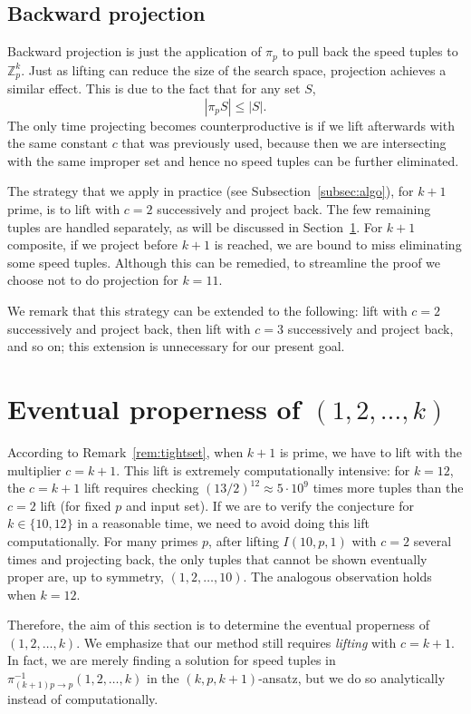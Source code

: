 \documentclass[11pt]{amsart}
\newcommand{\Z}{\mathbb{Z}}
\newcommand{\onetok}{(1, 2, \dots, k)}
\theoremstyle{definition}
\theoremstyle{remark}
\begin{document}
\subsection{Backward projection}
\label{subsec:backproj}
Backward projection is just the application of $\pi_p$ to pull back the speed tuples to $\Z^k_{p}$.
Just as lifting can reduce the size of the search space, projection achieves a similar effect. 
This is due to the fact that for any set $S$,
\[|\pi_p S| \leq |S|.\]
The only time projecting becomes counterproductive is if we lift afterwards with the same constant $c$ that was previously used,
because then we are intersecting with the same improper set and hence no speed tuples can be further eliminated.

The strategy that we apply in practice (see Subsection~\ref{subsec:algo}), for $k+1$ prime,
is to lift with $c=2$ successively and project back.
The few remaining tuples are handled separately, as will be discussed in Section~\ref{sec:onetok}.
For $k+1$ composite, if we project before $k+1$ is reached, 
we are bound to miss eliminating some speed tuples. 
Although this can be remedied, to streamline the proof we choose not to do projection for $k=11$. 

We remark that this strategy can be extended to the following:
lift with $c=2$ successively and project back, then lift with $c=3$ successively and project back, and so on;
this extension is unnecessary for our present goal.

\section{Eventual properness of
  \texorpdfstring{$(1, 2,\ldots, k)$}{(1, 2, ..., k)}
} \label{sec:onetok}
According to Remark~\ref{rem:tightset}, when $k+1$ is prime, we have to lift with the multiplier $c=k+1$. 
This lift is extremely computationally intensive: for $k=12$, the $c=k+1$ lift requires checking $(13/2)^{12}\approx5\cdot10^9$ 
times more tuples than the $c=2$ lift (for fixed $p$ and input set).
If we are to verify the conjecture for $k\in\{10,12\}$ in a reasonable time, we need to avoid doing this lift computationally.
For many primes $p$, after lifting $I(10,p,1)$ with $c=2$ several times and projecting back,
the only tuples that cannot be shown eventually proper are, up to symmetry, $( 1, 2, \ldots, 10 )$. 
The analogous observation holds when $k=12$.

Therefore, the aim of this section is to determine the eventual properness
of $\onetok$. 
We emphasize that our method still requires \emph{lifting} with $c=k+1$. 
In fact, we are merely finding a solution for speed tuples in $\pi^{-1}_{(k+1)p\rightarrow p}\onetok$ in the $(k,p,k+1)$-ansatz,
but we do so analytically instead of computationally.
\end{document}
